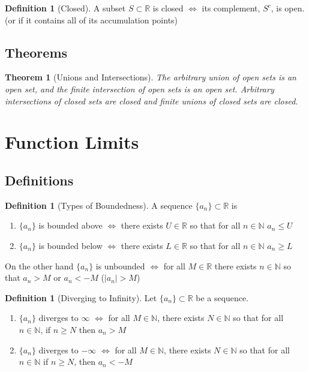 \documentclass[12pt]{article}
\newtheorem*{thm*}{Theorem}
\theoremstyle{definition}
\newtheorem{defn}[thm]{Definition}
\theoremstyle{remark}
\numberwithin{equation}{section}
\newcommand\R{\mathbb R}    %
\newcommand\N{\mathbb N}    %
\begin{document}
\begin{defn}[Closed]
        A subset $S \subset \R$ is closed $\iff$ its complement, $S^c$, is open. (or if it contains all of its accumulation points)
\end{defn}





\subsection{Theorems}

\begin{thm*}[Unions and Intersections]
        The arbitrary union of open sets is an open set, and the finite intersection of open sets is an open set. Arbitrary intersections of closed sets are closed and finite unions of closed sets are closed.
\end{thm*}

\clearpage


\section{Function Limits}



\subsection{Definitions}


\begin{defn}[Types of Boundedness]
        A sequence $\{a_n\} \subset \R$ is 
        \begin{enumerate}
                \item $\{a_n\}$ is bounded above $\iff$ there exists $U \in \R$ so that for all $n \in \N$ $a_n \leq U$
                \item $\{a_n\}$ is bounded below $\iff$ there exists $L \in \R$ so that for all $n \in \N$ $a_n \geq L$
        \end{enumerate}
        On the other hand $\{a_n\}$ is unbounded $\iff$ for all $M \in \R$ there exists $n \in \N$ so that $a_n > M$ or $a_n < -M$ ($|a_n| > M$)
\end{defn}



\begin{defn}[Diverging to Infinity]
        Let $\{a_n\} \subset \R$ be a sequence.
        \begin{enumerate}
                \item $\{a_n\}$ diverges to $\infty$ $\iff$ for all $M \in \N$, there exists $N \in \N$ so that for all $n \in \N$, if $n \geq N$ then $a_n >M$
                \item $\{a_n\}$ diverges to $-\infty$ $\iff$ for all $M \in \N$, there exists $N \in \N$ so that for all $n \in \N$ if $n \geq N$, then $a_n < -M$
        \end{enumerate}
\end{defn}
\end{document}
